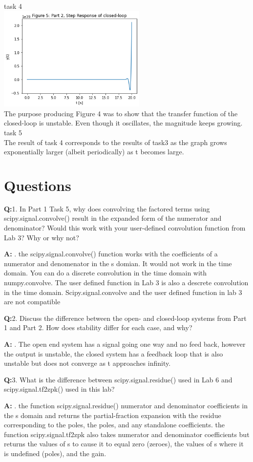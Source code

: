 \documentclass[12pt,a4paper]{article}
\newcommand{\Q}{\leavevmode\par\textbf {Q:}}
\newcommand{\A}{\par\textbf{A:} \normalfont}
\begin{document}
task 4\\
\includegraphics[width=0.55\textwidth]{Figure5.png}\\
The purpose producing Figure 4 was to show that the transfer function of the closed-loop is unstable.  Even though it oscillates, the magnitude keeps growing.\\


task 5\\
The result of task 4 corresponds to the results of task3 as the graph grows exponentially larger (albeit periodically) as t becomes large.



\section{Questions}\label{sec:res}

\Q 1. In Part 1 Task 5, why does convolving the factored terms using scipy.signal.convolve() result in the expanded form of the numerator and denominator? Would this work with your user-defined convolution function from Lab 3? Why or why not? 
\A 1. the scipy.signal.convolve() function works with the coefficients of a numerator and denomenator in the s domian.  It would not work in the time domain.  You can do a discrete convolution in the time domain with numpy.convolve. The user defined function in Lab 3 is also a descrete convolution in the time domain.  Scipy.signal.convolve and the user defined function in lab 3 are not compatible

\Q 2. Discuss the difference between the open- and closed-loop systems from Part 1 and Part 2. How does stability differ for each case, and why?
\A 2. The open end system  has a signal going one way and no feed back, however the output is unstable, the closed system  has a feedback loop that is also unstable but does not converge as t approaches infinity.

\Q 3. What is the difference between scipy.signal.residue() used in Lab 6 and scipy.signal.tf2zpk() used in this lab?
\A 3. the function scipy.signal.residue() numerator and denominator coefficients in the s domain and returns the partial-fraction expansion with the residue corresponding to the poles, the poles, and any standalone coefficients. the function scipy.signal.tf2zpk also takes numerator and denominator coefficients but returns the values of s to cause it to equal zero (zeroes), the values of s where it is undefined (poles), and the gain.
\end{document}
